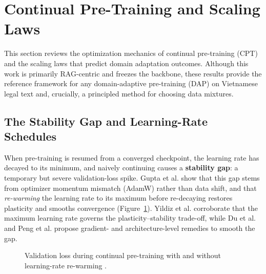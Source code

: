 \section{Continual Pre-Training and Scaling Laws}

This section reviews the optimization mechanics of continual pre-training (CPT) and the scaling laws that predict domain adaptation outcomes. Although this work is primarily RAG-centric and freezes the backbone, these results provide the reference framework for any domain-adaptive pre-training (DAP) on Vietnamese legal text and, crucially, a principled method for choosing data mixtures.

\subsection{The Stability Gap and Learning-Rate Schedules}
When pre-training is resumed from a converged checkpoint, the learning rate has decayed to its minimum, and naively continuing causes a \textbf{stability gap}: a temporary but severe validation-loss spike. Gupta et al. \parencite{gupta2023continualpretraininglargelanguage} show that this gap stems from optimizer momentum mismatch (AdamW) rather than data shift, and that \emph{re-warming} the learning rate to its maximum before re-decaying restores plasticity and smooths convergence (Figure~\ref{fig:stability_gap}). Yildiz et al. \parencite{yildiz2025investigatingcontinualpretraininglarge} corroborate that the maximum learning rate governs the plasticity--stability trade-off, while Du et al. \parencite{du2024unlockingcontinuallearningabilities} and Peng et al. \parencite{peng2024scalablelanguagemodelgeneralized} propose gradient- and architecture-level remedies to smooth the gap.

\begin{figure}[H]
\centering
{}
\caption{Validation loss during continual pre-training with and without learning-rate re-warming \parencite{gupta2023continualpretraininglargelanguage}.}
\label{fig:stability_gap}
\end{figure}

